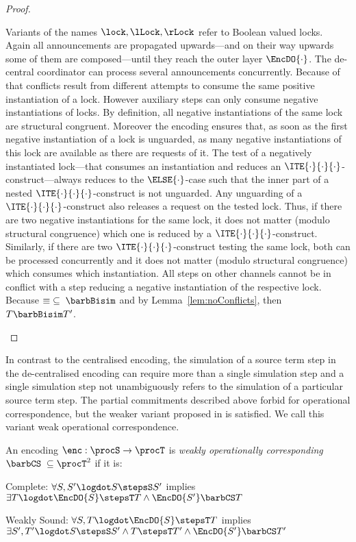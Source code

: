 \documentclass[]{eptcs}
\begin{document}
\begin{proof}
\begin{compactenum}
		\item Variants of the names $ \lock, \lLock, \rLock $ refer to Boolean valued locks. Again all announcements are propagated upwards---and on their way upwards some of them are composed---until they reach the outer layer $ \EncDO{\cdot} $. The de-central coordinator can process several announcements concurrently. Because of that conflicts result from different attempts to consume the same positive instantiation of a lock. However auxiliary steps can only consume negative instantiations of locks.
			By definition, all negative instantiations of the same lock are structural congruent. Moreover the encoding ensures that, as soon as the first negative instantiation of a lock is unguarded, as many negative instantiations of this lock are available as there are requests of it. The test of a negatively instantiated lock---that consumes an instantiation and reduces an $ \ITE{\cdot}{\cdot}{\cdot} $-construct---always reduces to the $ \ELSE{\cdot} $-case such that the inner part of a nested $ \ITE{\cdot}{\cdot}{\cdot} $-construct is not unguarded. Any unguarding of a $ \ITE{\cdot}{\cdot}{\cdot} $-construct also releases a request on the tested lock.
			Thus, if there are two negative instantiations for the same lock, it does not matter (modulo structural congruence) which one is reduced by a $ \ITE{\cdot}{\cdot}{\cdot} $-construct. Similarly, if there are two $ \ITE{\cdot}{\cdot}{\cdot} $-construct testing the same lock, both can be processed concurrently and it does not matter (modulo structural congruence) which consumes which instantiation.
			All steps on other channels cannot be in conflict with a step reducing a negative instantiation of the respective lock. Because $ \equiv \; \subseteq \; \barbBisim $ and by Lemma~\ref{lem:noConflicts}, then $ T \barbBisim T' $.
	\end{compactenum}
\end{proof}

In contrast to the centralised encoding, the simulation of a source term step in the de-centralised encoding can require more than a single simulation step and a single simulation step not unambiguously refers to the simulation of a particular source term step. The partial commitments described above forbid for operational correspondence, but the weaker variant proposed in \cite{gorla10} is satisfied. We call this variant weak operational correspondence.

\begin{definition}
	$ $\\
	An encoding $ \enc: \procS \to \procT $ is \emph{weakly operationally corresponding} \wrt $ \barbCS \; \subseteq \procT^2 $ if it is:
	\begin{compactitem}
		\item[\; Complete:] $ \forall S, S' \logdot S \stepsS S' $ implies $ \exists T \logdot \EncDO{S} \stepsT T \wedge \EncDO{S'} \barbCS T $
		\item[\; Weakly Sound:] $ \forall S, T \logdot \EncDO{S} \stepsT T $ implies $ \exists S', T' \logdot S \stepsS S' \wedge T \stepsT T' \wedge \EncDO{S'} \barbCS T' $
	\end{compactitem}
\end{definition}
\end{document}
